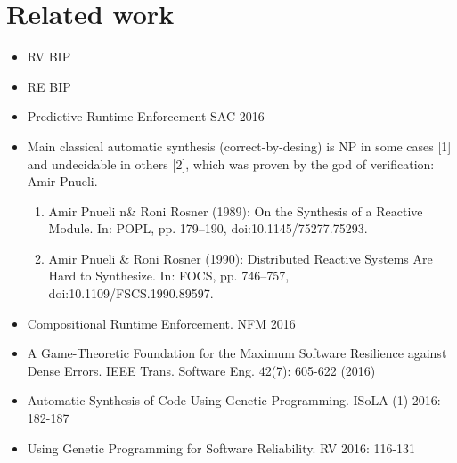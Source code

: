 \section{Related work}

\begin{itemize}
\item RV BIP 
\item RE BIP
\item Predictive Runtime Enforcement SAC 2016
\item Main classical automatic synthesis (correct-by-desing) is NP in some cases [1] and undecidable in others [2], which was proven by the god of verification: Amir Pnueli. 
\begin{enumerate}
\item Amir Pnueli n\& Roni Rosner (1989): On the Synthesis of a Reactive Module. In: POPL, pp. 179–190, doi:10.1145/75277.75293. 
\item Amir Pnueli \& Roni Rosner (1990): Distributed Reactive Systems Are Hard to Synthesize. In: FOCS, pp. 746–757, doi:10.1109/FSCS.1990.89597.  
\end{enumerate}
\item Compositional Runtime Enforcement. NFM 2016
\item A Game-Theoretic Foundation for the Maximum Software Resilience against Dense Errors. IEEE Trans. Software Eng. 42(7): 605-622 (2016)
\item Automatic Synthesis of Code Using Genetic Programming. ISoLA (1) 2016: 182-187
\item Using Genetic Programming for Software Reliability. RV 2016: 116-131
\end{itemize}